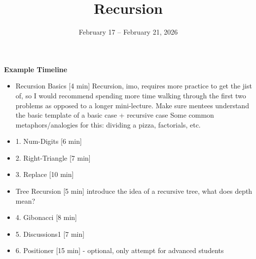 \documentclass{exam}
\title{Recursion}
\date{February 17 -- February 21, 2026}
\begin{document}
\maketitle

\begin{meta}
    \textbf{Example Timeline}
    \begin{itemize}
        \item Recursion Basics [4 min]
        \subitem Recursion, imo, requires more practice to get the jist of, so I would recommend spending more time walking through the first two problems as opposed to a longer mini-lecture.
        \subitem Make sure mentees understand the basic template of a basic case + recursive case 
        \subitem Some common metaphors/analogies for this: dividing a pizza, factorials, etc.
        \item 1. Num-Digits [6 min]
        \item 2. Right-Triangle [7 min]
        \item 3. Replace [10 min]
        \item Tree Recursion [5 min]
        \subitem introduce the idea of a recursive tree, what does depth mean? 
        \item 4. Gibonacci [8 min] 
        \item 5. Discussions1 [7 min]
        \item 6. Positioner [15 min] - optional, only attempt for advanced students
    \end{itemize}
\end{meta} 
\end{document}

